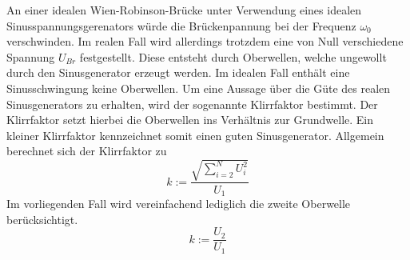 An einer idealen Wien-Robinson-Brücke unter Verwendung eines idealen Sinusspannungsgerenators würde die Brückenpannung bei der Frequenz $\omega_0$ verschwinden. Im realen Fall wird allerdings trotzdem eine von Null verschiedene Spannung $U_{Br}$ festgestellt.
Diese entsteht durch Oberwellen, welche ungewollt durch den Sinusgenerator erzeugt werden. Im idealen Fall enthält eine Sinusschwingung keine Oberwellen. Um eine Aussage über die Güte des realen Sinusgenerators zu erhalten, wird der sogenannte Klirrfaktor bestimmt.
Der Klirrfaktor setzt hierbei die Oberwellen ins Verhältnis zur Grundwelle. Ein kleiner Klirrfaktor kennzeichnet somit einen guten Sinusgenerator.
Allgemein berechnet sich der Klirrfaktor zu
\begin{equation}
k:=\frac{\sqrt{\sum_{i=2}^{N}{U_i^2}}}{U_1}
\end{equation}
Im vorliegenden Fall wird vereinfachend lediglich die zweite Oberwelle berücksichtigt.
\begin{equation}
  \label{eqn:klirrfaktor}
k:=\frac{U_2}{U_1}
\end{equation}
